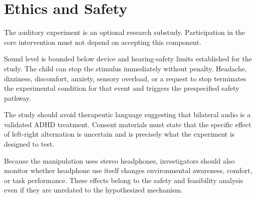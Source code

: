 \section{Ethics and Safety}

The auditory experiment is an optional research substudy. Participation in the core intervention must not depend on accepting this component.

Sound level is bounded below device and hearing-safety limits established for the study. The child can stop the stimulus immediately without penalty. Headache, dizziness, discomfort, anxiety, sensory overload, or a request to stop terminates the experimental condition for that event and triggers the prespecified safety pathway.

The study should avoid therapeutic language suggesting that bilateral audio is a validated ADHD treatment. Consent materials must state that the specific effect of left-right alternation is uncertain and is precisely what the experiment is designed to test.

Because the manipulation uses stereo headphones, investigators should also monitor whether headphone use itself changes environmental awareness, comfort, or task performance. These effects belong to the safety and feasibility analysis even if they are unrelated to the hypothesized mechanism.

